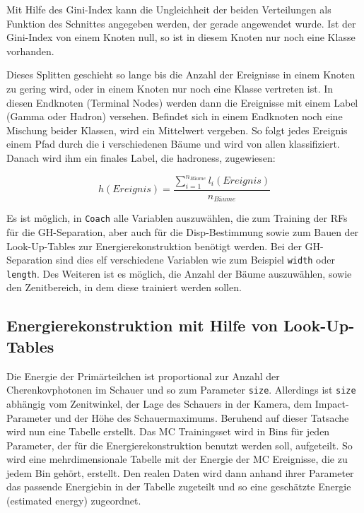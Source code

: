 Mit Hilfe des Gini-Index kann die Ungleichheit der beiden Verteilungen als Funktion des Schnittes angegeben werden, der gerade angewendet wurde.
Ist der Gini-Index von einem Knoten null, so ist in diesem Knoten nur noch eine Klasse vorhanden.

Dieses Splitten geschieht so lange bis die Anzahl der Ereignisse in einem Knoten zu gering wird, oder in einem Knoten nur noch eine Klasse vertreten ist.
In diesen Endknoten (Terminal Nodes) werden dann die Ereignisse mit einem Label (Gamma oder Hadron) versehen. 
Befindet sich in einem Endknoten noch eine Mischung beider Klassen, wird ein Mittelwert vergeben.
So folgt jedes Ereignis einem Pfad durch die i verschiedenen Bäume und wird von allen klassifiziert.
Danach wird ihm ein finales Label, die hadroness, zugewiesen:

\begin{equation}
 h(Ereignis)=\frac{ \sum_{i=1} ^{n_{Bäume}} l_i(Ereignis)}{n_{Bäume}}
\end{equation}

Es ist möglich, in \texttt{Coach} alle Variablen auszuwählen, die zum Training der RFs für die GH-Separation, aber auch für die Disp-Bestimmung sowie zum Bauen der Look-Up-Tables zur Energierekonstruktion benötigt werden.
Bei der GH-Separation sind dies elf verschiedene Variablen wie zum Beispiel \texttt{width} oder \texttt{length}.
Des Weiteren ist es möglich, die Anzahl der Bäume auszuwählen, sowie den Zenitbereich, in dem diese trainiert werden sollen.

\subsection{Energierekonstruktion mit Hilfe von Look-Up-Tables}
Die Energie der Primärteilchen ist proportional zur Anzahl der Cherenkovphotonen im Schauer und so zum Parameter \texttt{size}.
Allerdings ist \texttt{size} abhängig vom Zenitwinkel, der Lage des Schauers in der Kamera, dem Impact-Parameter und der Höhe des Schauermaximums.
Beruhend auf dieser Tatsache wird nun eine Tabelle erstellt.
Das MC Trainingsset wird in Bins für jeden Parameter, der für die Energierekonstruktion benutzt werden soll, aufgeteilt.
So wird eine mehrdimensionale Tabelle mit der Energie der MC Ereignisse, die zu jedem Bin gehört, erstellt.
Den realen Daten wird dann anhand ihrer Parameter das passende Energiebin in der Tabelle zugeteilt und so eine geschätzte Energie (estimated energy) zugeordnet.

